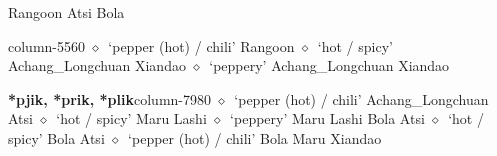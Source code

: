          Rangoon 
\hspace{1ex}
         Atsi 
\hspace{1ex}
         Bola 
  \item {\footnotesize \textbf{}}{\tiny column-5560}
         $\diamond$~`pepper (hot) / chili'
         Rangoon 
\hspace{1ex}
         $\diamond$~`hot / spicy'
         Achang\_Longchuan 
\hspace{1ex}
         Xiandao 
\hspace{1ex}
         $\diamond$~`peppery'
         Achang\_Longchuan 
\hspace{1ex}
         Xiandao 
  \item {\footnotesize \textbf{*pjik, *prik, *plik}}{\tiny column-7980}
         $\diamond$~`pepper (hot) / chili'
         Achang\_Longchuan 
\hspace{1ex}
         Atsi 
\hspace{1ex}
         $\diamond$~`hot / spicy'
         Maru 
\hspace{1ex}
         Lashi 
\hspace{1ex}
         $\diamond$~`peppery'
         Maru 
\hspace{1ex}
         Lashi 
\hspace{1ex}
         Bola 
\hspace{1ex}
         Atsi 
\hspace{1ex}
         $\diamond$~`hot / spicy'
         Bola 
\hspace{1ex}
         Atsi 
\hspace{1ex}
         $\diamond$~`pepper (hot) / chili'
         Bola 
\hspace{1ex}
         Maru 
\hspace{1ex}
         Xiandao 
